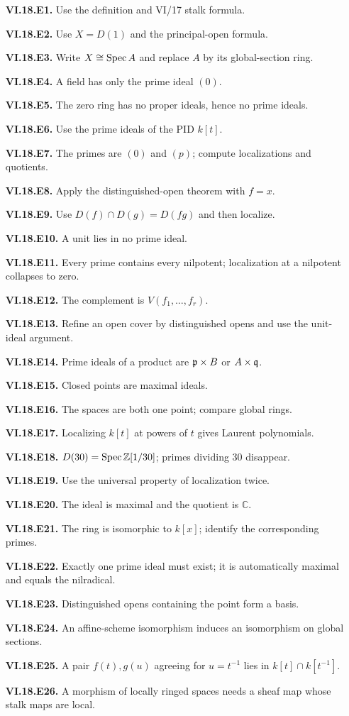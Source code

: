 \begin{enumerate}
\item[\textbf{VI.18.E1.}] Use the definition and VI/17 stalk formula.
\item[\textbf{VI.18.E2.}] Use $X=D(1)$ and the principal-open formula.
\item[\textbf{VI.18.E3.}] Write $X\cong\operatorname{Spec} A$ and replace $A$ by its global-section ring.
\item[\textbf{VI.18.E4.}] A field has only the prime ideal $(0)$.
\item[\textbf{VI.18.E5.}] The zero ring has no proper ideals, hence no prime ideals.
\item[\textbf{VI.18.E6.}] Use the prime ideals of the PID $k[t]$.
\item[\textbf{VI.18.E7.}] The primes are $(0)$ and $(p)$; compute localizations and quotients.
\item[\textbf{VI.18.E8.}] Apply the distinguished-open theorem with $f=x$.
\item[\textbf{VI.18.E9.}] Use $D(f)\cap D(g)=D(fg)$ and then localize.
\item[\textbf{VI.18.E10.}] A unit lies in no prime ideal.
\item[\textbf{VI.18.E11.}] Every prime contains every nilpotent; localization at a nilpotent collapses to zero.
\item[\textbf{VI.18.E12.}] The complement is $V(f_1,\dots,f_r)$.
\item[\textbf{VI.18.E13.}] Refine an open cover by distinguished opens and use the unit-ideal argument.
\item[\textbf{VI.18.E14.}] Prime ideals of a product are $\mathfrak p\times B$ or $A\times\mathfrak q$.
\item[\textbf{VI.18.E15.}] Closed points are maximal ideals.
\item[\textbf{VI.18.E16.}] The spaces are both one point; compare global rings.
\item[\textbf{VI.18.E17.}] Localizing $k[t]$ at powers of $t$ gives Laurent polynomials.
\item[\textbf{VI.18.E18.}] $D(30)=\operatorname{Spec}\mathbb Z[1/30]$; primes dividing 30 disappear.
\item[\textbf{VI.18.E19.}] Use the universal property of localization twice.
\item[\textbf{VI.18.E20.}] The ideal is maximal and the quotient is $\mathbb C$.
\item[\textbf{VI.18.E21.}] The ring is isomorphic to $k[x]$; identify the corresponding primes.
\item[\textbf{VI.18.E22.}] Exactly one prime ideal must exist; it is automatically maximal and equals the nilradical.
\item[\textbf{VI.18.E23.}] Distinguished opens containing the point form a basis.
\item[\textbf{VI.18.E24.}] An affine-scheme isomorphism induces an isomorphism on global sections.
\item[\textbf{VI.18.E25.}] A pair $f(t),g(u)$ agreeing for $u=t^{-1}$ lies in $k[t]\cap k[t^{-1}]$.
\item[\textbf{VI.18.E26.}] A morphism of locally ringed spaces needs a sheaf map whose stalk maps are local.
\end{enumerate}
